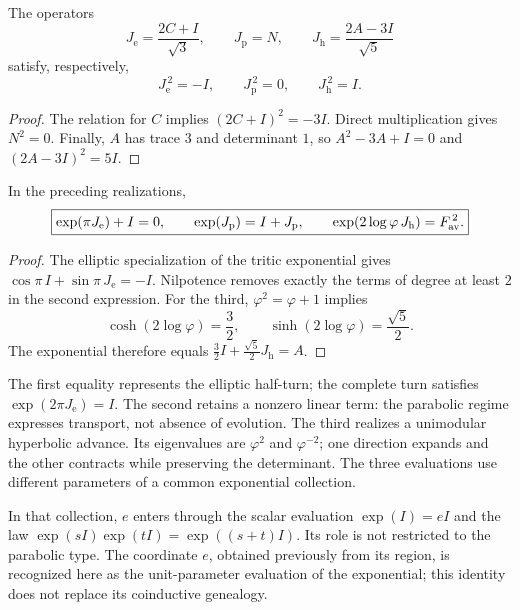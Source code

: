 \begin{proposition}
\label{euler-trit-generadores}
The operators
\[
 J_{\mathrm e}=\frac{2C+I}{\sqrt3},\qquad
 J_{\mathrm p}=N,\qquad
 J_{\mathrm h}=\frac{2A-3I}{\sqrt5}
\]
satisfy, respectively,
\[
 J_{\mathrm e}^{\,2}=-I,\qquad
 J_{\mathrm p}^{\,2}=0,\qquad
 J_{\mathrm h}^{\,2}=I.
\]
\end{proposition}
\begin{proof}
The relation for \(C\) implies \((2C+I)^2=-3I\).
Direct multiplication gives \(N^2=0\).
Finally, \(A\) has trace \(3\) and determinant \(1\), so
\(A^2-3A+I=0\) and \((2A-3I)^2=5I\).
\end{proof}

\begin{proposition}
\label{euler-trit-evaluaciones}
In the preceding realizations,
\begin{equation}
 \boxed{
 \exp(\pi J_{\mathrm e})+I=0,\qquad
 \exp(J_{\mathrm p})=I+J_{\mathrm p},\qquad
 \exp(2\log\varphi\,J_{\mathrm h})=F_{\rm av}^{\,2}.}
 \label{euler-trit-tres-evaluaciones}
\end{equation}
\end{proposition}
\begin{proof}
The elliptic specialization of the tritic exponential gives
\(\cos\pi\,I+\sin\pi\,J_{\mathrm e}=-I\).
Nilpotence removes exactly the terms of degree at least \(2\)
in the second expression. For the third, \(\varphi^2=\varphi+1\) implies
\[
 \cosh(2\log\varphi)=\frac32,\qquad
 \sinh(2\log\varphi)=\frac{\sqrt5}{2}.
\]
The exponential therefore equals
\(\frac32I+\frac{\sqrt5}{2}J_{\mathrm h}=A\).
\end{proof}

The first equality represents the elliptic half-turn; the complete turn
satisfies \(\exp(2\pi J_{\mathrm e})=I\). The second retains a nonzero
linear term: the parabolic regime expresses transport, not absence of
evolution. The third realizes a unimodular hyperbolic advance. Its
eigenvalues are \(\varphi^2\) and \(\varphi^{-2}\); one direction expands and
the other contracts while preserving the determinant. The three evaluations
use different parameters of a common exponential collection.

In that collection, \(e\) enters through the scalar evaluation
\(\exp(I)=eI\) and the law \(\exp(sI)\exp(tI)=\exp((s+t)I)\).
Its role is not restricted to the parabolic type. The coordinate \(e\), obtained
previously from its region, is recognized here as the unit-parameter evaluation
of the exponential; this identity does not replace its coinductive genealogy.

